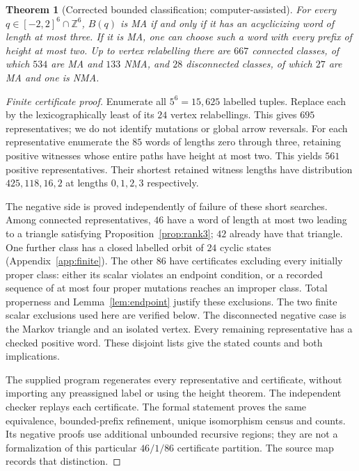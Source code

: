 \documentclass[11pt]{amsart}
\newtheorem{theorem}{Theorem}[section]
\theoremstyle{definition}\newtheorem{definition}[theorem]{Definition}
\theoremstyle{remark}\newtheorem{remark}[theorem]{Remark}
\newcommand{\Z}{\mathbb Z}\newcommand{\N}{\mathbb N}
\newcommand{\code}[1]{\texttt{\small\detokenize{#1}}}
\begin{document}
\begin{theorem}[Corrected bounded classification; computer-assisted]\label{thm:census}
For every $q\in[-2,2]^6\cap\Z^6$, $B(q)$ is MA if and only if it has an acyclicizing word of length at most three. If it is MA, one can choose such a word with every prefix of height at most two. Up to vertex relabelling there are $667$ connected classes, of which $534$ are MA and $133$ NMA, and $28$ disconnected classes, of which $27$ are MA and one is NMA.
\end{theorem}
\begin{proof}[Finite certificate proof]
Enumerate all $5^6=15,625$ labelled tuples. Replace each by the lexicographically least of its $24$ vertex relabellings. This gives $695$ representatives; we do not identify mutations or global arrow reversals. For each representative enumerate the $85$ words of lengths zero through three, retaining positive witnesses whose entire paths have height at most two. This yields $561$ positive representatives. Their shortest retained witness lengths have distribution $425,118,16,2$ at lengths $0,1,2,3$ respectively.

The negative side is proved independently of failure of these short searches. Among connected representatives, $46$ have a word of length at most two leading to a triangle satisfying Proposition~\ref{prop:rank3}; $42$ already have that triangle. One further class has a closed labelled orbit of $24$ cyclic states (Appendix~\ref{app:finite}). The other $86$ have certificates excluding every initially proper class: either its scalar violates an endpoint condition, or a recorded sequence of at most four proper mutations reaches an improper class. Total properness and Lemma~\ref{lem:endpoint} justify these exclusions. The two finite scalar exclusions used here are verified below. The disconnected negative case is the Markov triangle and an isolated vertex. Every remaining representative has a checked positive word. These disjoint lists give the stated counts and both implications.

The supplied program \code{scripts/census.py} regenerates every representative and certificate, without importing any preassigned label or using the height theorem. The independent checker replays each certificate. The formal statement \code{corrected_bounded_classification} proves the same equivalence, bounded-prefix refinement, unique isomorphism census and counts. Its negative proofs use additional unbounded recursive regions; they are not a formalization of this particular $46/1/86$ certificate partition. The source map records that distinction.
\end{proof}
\end{document}
